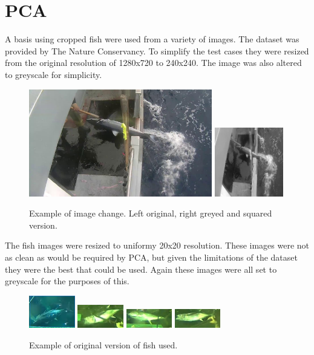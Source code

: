 \documentclass[11pt]{article} %
\begin{document}
\section{PCA}
A basis using cropped fish were used from a variety of images. The dataset was provided by The Nature Conservancy. To simplify the test cases
they were resized from the original resolution of 1280x720 to 240x240. The image was also altered to greyscale for simplicity.
\begin{figure}[h]
\includegraphics[width=8cm,keepaspectratio]{Images/colorpicture.jpg}
\includegraphics[width=3cm,keepaspectratio]{Images/test2.png}
\caption{Example of image change. Left original, right greyed and squared version.}
\end{figure}

The fish images were resized to uniformy 20x20 resolution. These images were not as clean as would be required by PCA, but given
the limitations of the dataset they were the best that could be used. Again these images were all set to greyscale for the purposes of this.
\begin{figure}[h]
\includegraphics[width=2cm,keepaspectratio]{Images/fish1.png}
\includegraphics[width=2cm,keepaspectratio]{Images/fish2.png}
\includegraphics[width=2cm,keepaspectratio]{Images/fish3.png}
\includegraphics[width=2cm,keepaspectratio]{Images/fish4.png}
\caption{Example of original version of fish used.}
\end{figure}
\end{document}
